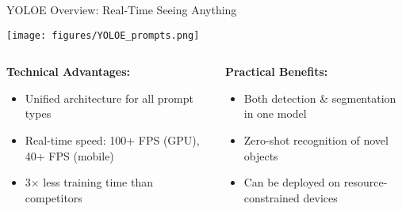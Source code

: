 \documentclass{beamer}
\begin{document}
\begin{frame}{YOLOE Overview: Real-Time Seeing Anything}
    \begin{center}
        \texttt{[image: figures/YOLOE\_prompts.png]}
        \vspace{0.1cm}
    \end{center}
    
    \vspace{0.2cm}
    
    \begin{columns}[T]
        \begin{column}{0.48\textwidth}
            \textbf{Technical Advantages:}
            \begin{itemize}\small
                \item \textcolor{ubburgundy}{Unified architecture} for all prompt types
                \item \textcolor{ubburgundy}{Real-time speed}: 100+ FPS (GPU), 40+ FPS (mobile)
                \item \textcolor{ubburgundy}{3× less training time} than competitors
            \end{itemize}
        \end{column}
        
        \begin{column}{0.48\textwidth}
            \textbf{Practical Benefits:}
            \begin{itemize}\small
                \item Both detection \& segmentation in one model
                \item Zero-shot recognition of novel objects
                \item Can be deployed on resource-constrained devices
            \end{itemize}
        \end{column}
    \end{columns}
\end{frame}
\end{document}
